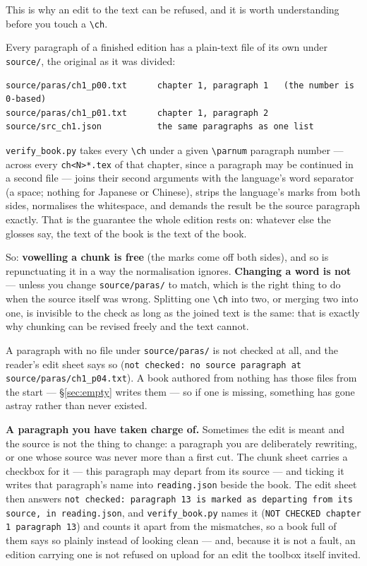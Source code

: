 \documentclass[11pt,oneside]{report}
\newcommand{\file}[1]{\texttt{#1}}
\newcommand{\menu}[1]{\textsf{#1}}
\begin{document}
This is why an edit to the text can be refused, and it is worth understanding
before you touch a \verb|\ch|.

Every paragraph of a finished edition has a plain-text file of its own under
\file{source/}, the original as it was divided:

\begin{lstlisting}
source/paras/ch1_p00.txt      chapter 1, paragraph 1   (the number is 0-based)
source/paras/ch1_p01.txt      chapter 1, paragraph 2
source/src_ch1.json           the same paragraphs as one list
\end{lstlisting}

\noindent \file{verify\_book.py} takes every \verb|\ch| under a given
\verb|\parnum| paragraph number --- across every \file{ch<N>*.tex} of that
chapter, since a paragraph may be continued in a second file --- joins their
second arguments with the language's word separator (a space; nothing for
Japanese or Chinese), strips the language's marks from both sides,
normalises the whitespace, and demands the result be the source paragraph
exactly. That is the guarantee the whole edition rests on: whatever else the
glosses say, the text of the book is the text of the book.

So: \textbf{vowelling a chunk is free} (the marks come off both sides), and so
is repunctuating it in a way the normalisation ignores. \textbf{Changing a
word is not} --- unless you change \file{source/paras/} to match, which is the
right thing to do when the source itself was wrong. Splitting one \verb|\ch|
into two, or merging two into one, is invisible to the check as long as the
joined text is the same: that is exactly why chunking can be revised freely
and the text cannot.

\begin{warnbox}
A paragraph with no file under \file{source/paras/} is not checked at all, and
the reader's edit sheet says so (\texttt{not checked: no source paragraph at
source/paras/ch1\_p04.txt}). A book authored from nothing has those files
from the start --- \S\ref{sec:empty} writes them --- so if one is missing,
something has gone astray rather than never existed.
\end{warnbox}

\textbf{A paragraph you have taken charge of.} Sometimes the edit is meant and
the source is not the thing to change: a paragraph you are deliberately
rewriting, or one whose source was never more than a first cut. The chunk
sheet carries a checkbox for it --- \menu{this paragraph may depart from its
source} --- and ticking it writes that paragraph's name into
\file{reading.json} beside the book. The edit sheet then answers
\texttt{not checked: paragraph 13 is marked as departing from its source, in
reading.json}, and \file{verify\_book.py} names it (\texttt{NOT CHECKED
chapter 1 paragraph 13}) and counts it apart from the mismatches, so a book
full of them says so plainly instead of looking clean --- and, because it is
not a fault, an edition carrying one is not refused on upload for an edit the
toolbox itself invited.
\end{document}
